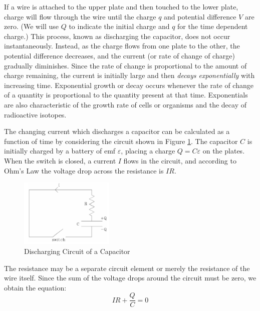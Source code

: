If a wire is attached to the upper plate and then touched to the lower plate, charge will flow through the wire until the charge $q$ and potential difference $V$ are zero. (We will use $Q$ to indicate the initial charge and $q$ for the time dependent charge.) This process, known as discharging the capacitor, does not occur instantaneously. Instead, as the charge flows from one plate to the other, the potential difference decreases, and the current (or rate of change of charge) gradually diminishes. Since the rate of change is proportional to the amount of charge remaining, the current is initially large and then \emph{decays exponentially} with increasing time. Exponential growth or decay occurs whenever the rate of change of a quantity is proportional to the quantity present at that time. Exponentials are also characteristic of the growth rate of cells or organisms and the decay of radioactive isotopes.

The changing current which discharges a capacitor can be calculated as a function of time by considering the circuit shown in Figure  \ref{fig:capcircuit1}. The capacitor $C$ is initially charged by a battery of emf $\varepsilon$, placing a charge $Q = C\varepsilon$ on the plates. When the switch is closed, a current $I$ flows in the circuit, and according to Ohm's Law the voltage drop across the resistance is $IR$.

\begin{figure}[h]
    \begin{center}
        \includegraphics[width=0.4\textwidth]{./Exp3/pic/image2.png}
    \end{center}
    \caption{Discharging Circuit of a Capacitor}
    \label{fig:capcircuit1}
\end{figure}

The resistance may be a separate circuit element or merely the resistance of the wire itself. Since the sum of the voltage drops around the circuit must be zero, we obtain the equation:
\begin{equation}
    IR + \frac{Q}{C} = 0
\end{equation}

